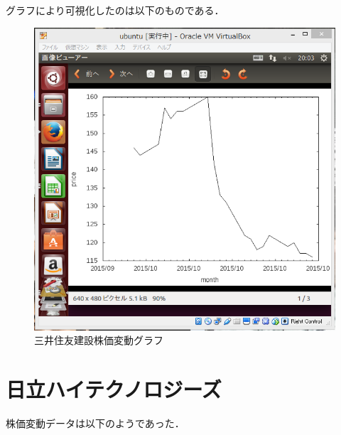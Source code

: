 {グラフにより可視化したのは以下のものである．




\begin{figure}[H]
\centering
\includegraphics[width=15cm]{1821.PNG}
\caption{三井住友建設株価変動グラフ}\label{サンプル図}
\end{figure}




\section{日立ハイテクノロジーズ}

株価変動データは以下のようであった．


}
